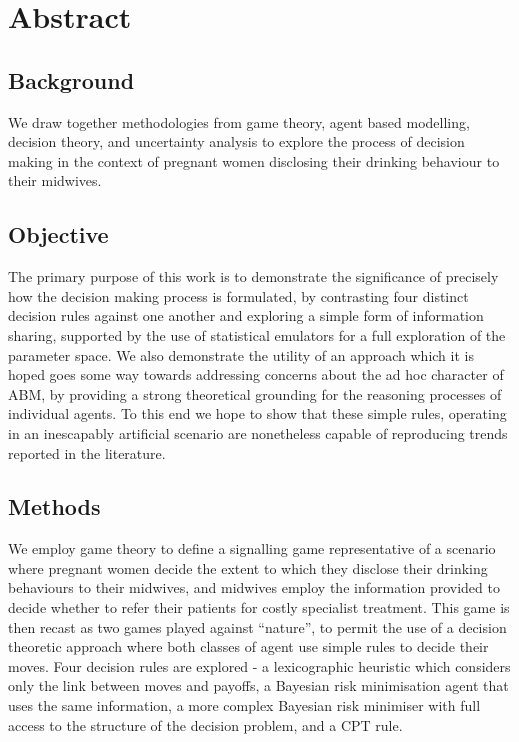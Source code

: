 \begingroup
\let\clearpage\relax
\let\cleardoublepage\relax



\section*{Abstract}

\subsection*{Background}

We draw together methodologies from game theory, agent based modelling, decision theory, and uncertainty analysis to explore the process of decision making in the context of pregnant women disclosing their drinking behaviour to their midwives.

\subsection*{Objective} 

The primary purpose of this work is to demonstrate the significance of precisely how the decision making process is formulated, by contrasting four distinct decision rules against one another and exploring a simple form of information sharing, supported by the use of statistical emulators for a full exploration of the parameter space.
We also demonstrate the utility of an approach which it is hoped goes some way towards addressing concerns about the ad hoc character of \ac{ABM}, by providing a strong theoretical grounding for the reasoning processes of individual agents. To this end we hope to show that these simple rules, operating in an inescapably artificial scenario are nonetheless capable of reproducing trends reported in the literature.

\subsection*{Methods} 

We employ game theory to define a signalling game representative of a scenario where pregnant women decide the extent to which they disclose their drinking behaviours to their midwives, and midwives employ the information provided to decide whether to refer their patients for costly specialist treatment. This game is then recast as two games played against \enquote{nature}, to permit the use of a decision theoretic approach where both classes of agent use simple rules to decide their moves.
Four decision rules are explored - a lexicographic heuristic which considers only the link between moves and payoffs, a Bayesian risk minimisation agent that uses the same information, a more complex Bayesian risk minimiser with full access to the structure of the decision problem, and a \ac{CPT} rule.

